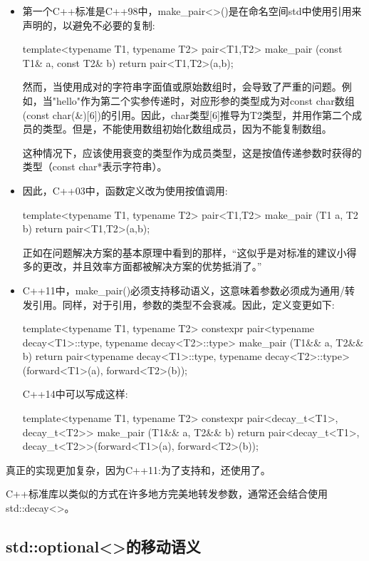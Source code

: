 \begin{itemize}
\item 第一个C++标准是C++98中，make_pair<>()是在命名空间std中使用引用来声明的，以避免不必要的复制:
\begin{cppcode}
template<typename T1, typename T2>
pair<T1,T2> make_pair (const T1& a, const T2& b)
{
	return pair<T1,T2>(a,b);
}
\end{cppcode}
然而，当使用成对的字符串字面值或原始数组时，会导致了严重的问题。例如，当"hello"作为第二个实参传递时，对应形参的类型成为对const char数组(const char(\&)[6])的引用。因此，char类型[6]推导为T2类型，并用作第二个成员的类型。但是，不能使用数组初始化数组成员，因为不能复制数组。

这种情况下，应该使用衰变的类型作为成员类型，这是按值传递参数时获得的类型（const char*表示字符串）。

\item 因此，C++03中，函数定义改为使用按值调用:
\begin{cppcode}
template<typename T1, typename T2>
pair<T1,T2> make_pair (T1 a, T2 b)
{
	return pair<T1,T2>(a,b);
}
\end{cppcode}
正如在问题解决方案的基本原理中看到的那样，“这似乎是对标准的建议小得多的更改，并且效率方面都被解决方案的优势抵消了。”

\item C++11中，make_pair()必须支持移动语义，这意味着参数必须成为通用/转发引用。同样，对于引用，参数的类型不会衰减。因此，定义变更如下:
\begin{cppcode}
template<typename T1, typename T2>
constexpr pair<typename decay<T1>::type, typename decay<T2>::type>
make_pair (T1&& a, T2&& b)
{
	return pair<typename decay<T1>::type,
	typename decay<T2>::type>(forward<T1>(a),
	forward<T2>(b));
}
\end{cppcode}
C++14中可以写成这样:
\begin{cppcode}
template<typename T1, typename T2>
constexpr pair<decay_t<T1>, decay_t<T2>>
make_pair (T1&& a, T2&& b)
{
	return pair<decay_t<T1>, decay_t<T2>>(forward<T1>(a), forward<T2>(b));
}
\end{cppcode}
\end{itemize}

真正的实现更加复杂，因为C++11:为了支持和，还使用了。

C++标准库以类似的方式在许多地方完美地转发参数，通常还会结合使用std::decay<>。

\subsection{std::optional<>的移动语义}


